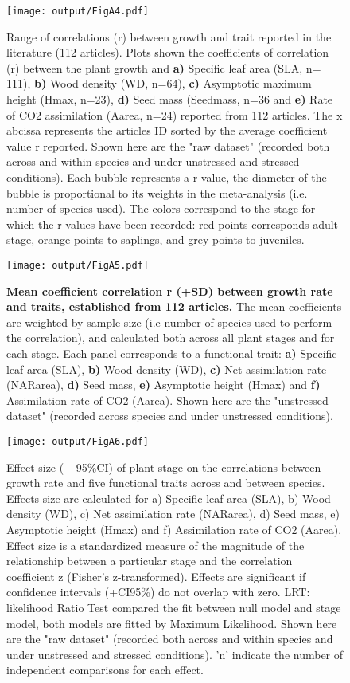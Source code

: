 \documentclass[a4paper]{article}\usepackage[]{graphicx}\usepackage[]{color}
\begin{document}
\begin{appendices}
\begin{figure}[htbp]
\centering
\texttt{[image: output/FigA4.pdf]}
\caption{Range of correlations (r) between
growth and trait reported in the literature (112 articles). Plots shown the coefficients of correlation (r)
between the plant growth and \textbf{a)} Specific leaf area (SLA, n=
111), \textbf{b)} Wood density (WD, n=64), \textbf{c)} Asymptotic
maximum height (Hmax, n=23), \textbf{d)} Seed mass (Seedmass, n=36 and
\textbf{e)} Rate of CO2 assimilation (Aarea, n=24) reported from 112
articles. The x abcissa represents the articles ID sorted by the average coefficient value r reported.
Shown here are the "raw dataset" (recorded both across and within species
and under unstressed and stressed conditions). Each bubble represents a r value, the diameter of the bubble
is proportional to its weights in the meta-analysis (i.e. number of species used). The colors
correspond to the stage for which the r values have been recorded: red
points corresponds adult stage, orange points to saplings, and grey
points to juveniles.}
\label{FigA4}
\end{figure}


\begin{figure}[htbp]
\centering
\texttt{[image: output/FigA5.pdf]}
\caption{\textbf{Mean coefficient correlation r (+SD) between growth rate and traits, established from 112 articles.} The mean coefficients are weighted by sample size (i.e number of species used to perform the correlation), and calculated both across all plant stages and for each stage. Each panel corresponds to a functional trait: \textbf{a)} Specific leaf area (SLA), \textbf{b)} Wood density (WD), \textbf{c)} Net assimilation rate (NARarea), \textbf{d)} Seed mass, \textbf{e)} Asymptotic height (Hmax) and \textbf{f)} Assimilation rate of CO2 (Aarea). Shown here are the "unstressed dataset" (recorded across species and under unstressed conditions).}
\label{FigA5}
\end{figure}

\begin{figure}[htbp]
\centering
\texttt{[image: output/FigA6.pdf]}
\caption{Effect size (+ 95\%CI) of plant stage on the correlations between growth rate and five functional traits across and between species. Effects size are calculated for a) Specific leaf area (SLA), b) Wood density (WD), c) Net assimilation rate (NARarea), d) Seed mass, e) Asymptotic height (Hmax) and f) Assimilation rate of CO2 (Aarea). Effect size is a standardized measure of the magnitude of the relationship between a particular stage and the correlation coefficient z (Fisher's z-transformed). Effects are significant if confidence intervals (+CI95\%) do not overlap with zero. LRT: likelihood Ratio Test compared the fit between null model and stage model, both models are fitted by Maximum Likelihood. Shown here are the "raw dataset" (recorded both across and within species and under unstressed and stressed conditions). 'n' indicate the number of independent comparisons for each effect.
}
\label{FigA6}
\end{figure}



\end{appendices}
\end{document}
